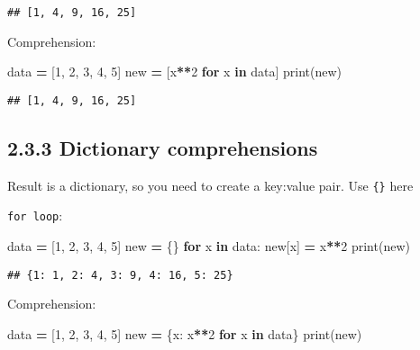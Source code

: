 \documentclass[]{book}
\newenvironment{Shaded}{\begin{snugshade}}{\end{snugshade}}
\newcommand{\BuiltInTok}[1]{#1}
\newcommand{\ControlFlowTok}[1]{\textcolor[rgb]{0.13,0.29,0.53}{\textbf{#1}}}
\newcommand{\DecValTok}[1]{\textcolor[rgb]{0.00,0.00,0.81}{#1}}
\newcommand{\KeywordTok}[1]{\textcolor[rgb]{0.13,0.29,0.53}{\textbf{#1}}}
\newcommand{\NormalTok}[1]{#1}
\newcommand{\OperatorTok}[1]{\textcolor[rgb]{0.81,0.36,0.00}{\textbf{#1}}}
\theoremstyle{definition}
\theoremstyle{definition}
\theoremstyle{definition}
\theoremstyle{remark}
\begin{document}
\begin{verbatim}
## [1, 4, 9, 16, 25]
\end{verbatim}

Comprehension:

\begin{Shaded}
\begin{Highlighting}[]
\NormalTok{data }\OperatorTok{=}\NormalTok{ [}\DecValTok{1}\NormalTok{, }\DecValTok{2}\NormalTok{, }\DecValTok{3}\NormalTok{, }\DecValTok{4}\NormalTok{, }\DecValTok{5}\NormalTok{]}
\NormalTok{new }\OperatorTok{=}\NormalTok{ [x}\OperatorTok{**}\DecValTok{2} \ControlFlowTok{for}\NormalTok{ x }\KeywordTok{in}\NormalTok{ data]}
\BuiltInTok{print}\NormalTok{(new)}
\end{Highlighting}
\end{Shaded}

\begin{verbatim}
## [1, 4, 9, 16, 25]
\end{verbatim}

\hypertarget{dictionary-comprehensions}{%
\subsection{2.3.3 Dictionary
comprehensions}\label{dictionary-comprehensions}}

Result is a dictionary, so you need to create a key:value pair. Use
\texttt{\{\}} here

\texttt{for\ loop}:

\begin{Shaded}
\begin{Highlighting}[]
\NormalTok{data }\OperatorTok{=}\NormalTok{ [}\DecValTok{1}\NormalTok{, }\DecValTok{2}\NormalTok{, }\DecValTok{3}\NormalTok{, }\DecValTok{4}\NormalTok{, }\DecValTok{5}\NormalTok{]}
\NormalTok{new }\OperatorTok{=}\NormalTok{ \{\}}
\ControlFlowTok{for}\NormalTok{ x }\KeywordTok{in}\NormalTok{ data:}
\NormalTok{    new[x] }\OperatorTok{=}\NormalTok{ x}\OperatorTok{**}\DecValTok{2}
\BuiltInTok{print}\NormalTok{(new)}
\end{Highlighting}
\end{Shaded}

\begin{verbatim}
## {1: 1, 2: 4, 3: 9, 4: 16, 5: 25}
\end{verbatim}

Comprehension:

\begin{Shaded}
\begin{Highlighting}[]
\NormalTok{data }\OperatorTok{=}\NormalTok{ [}\DecValTok{1}\NormalTok{, }\DecValTok{2}\NormalTok{, }\DecValTok{3}\NormalTok{, }\DecValTok{4}\NormalTok{, }\DecValTok{5}\NormalTok{]}
\NormalTok{new }\OperatorTok{=}\NormalTok{ \{x: x}\OperatorTok{**}\DecValTok{2} \ControlFlowTok{for}\NormalTok{ x }\KeywordTok{in}\NormalTok{ data\}}
\BuiltInTok{print}\NormalTok{(new)}
\end{Highlighting}
\end{Shaded}
\end{document}

